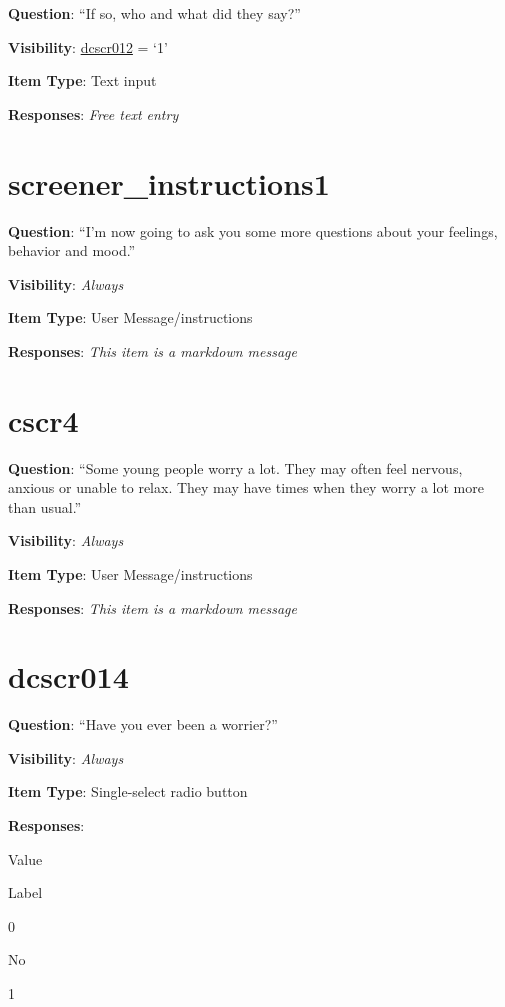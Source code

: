 \documentclass[]{book}
\begin{document}
\textbf{Question}: ``If so, who and what did they say?''

\textbf{Visibility}: \protect\hyperlink{dcscr012}{dcscr012} = `1'

\textbf{Item Type}: Text input

\textbf{Responses}: \emph{Free text entry}

\hypertarget{screener_instructions1}{%
\section{screener\_instructions1}\label{screener_instructions1}}

\textbf{Question}: ``I'm now going to ask you some more questions about your feelings, behavior and mood.''

\textbf{Visibility}: \emph{Always}

\textbf{Item Type}: User Message/instructions

\textbf{Responses}: \emph{This item is a markdown message}

\hypertarget{cscr4}{%
\section{cscr4}\label{cscr4}}

\textbf{Question}: ``Some young people worry a lot. They may often feel nervous, anxious or unable to relax. They may have times when they worry a lot more than usual.''

\textbf{Visibility}: \emph{Always}

\textbf{Item Type}: User Message/instructions

\textbf{Responses}: \emph{This item is a markdown message}

\hypertarget{dcscr014}{%
\section{dcscr014}\label{dcscr014}}

\textbf{Question}: ``Have you ever been a worrier?''

\textbf{Visibility}: \emph{Always}

\textbf{Item Type}: Single-select radio button

\textbf{Responses}:

Value

Label

0

No

1
\end{document}
